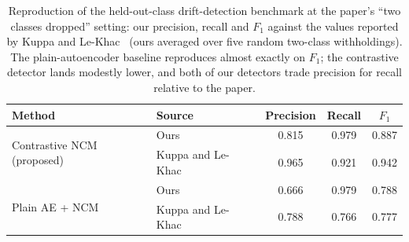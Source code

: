 \begin{table}[h]
\centering
\caption{Reproduction of the held-out-class drift-detection benchmark at the paper's ``two classes dropped'' setting: our precision, recall and $F_1$ against the values reported by Kuppa and Le-Khac~\cite{Kuppa_2022} (ours averaged over five random two-class withholdings). The plain-autoencoder baseline reproduces almost exactly on $F_1$; the contrastive detector lands modestly lower, and both of our detectors trade precision for recall relative to the paper.}
\label{tab:impl-reproduction}
\begin{tabular}{llccc}
\toprule
Method & Source & Precision & Recall & $F_1$ \\
\midrule
\multirow{2}{*}{Contrastive NCM (proposed)} & Ours              & 0.815 & 0.979 & 0.887 \\
                                            & Kuppa and Le-Khac~\cite{Kuppa_2022} & 0.965 & 0.921 & 0.942 \\
\midrule
\multirow{2}{*}{Plain AE + NCM}             & Ours              & 0.666 & 0.979 & 0.788 \\
                                            & Kuppa and Le-Khac~\cite{Kuppa_2022} & 0.788 & 0.766 & 0.777 \\
\bottomrule
\end{tabular}
\end{table}
